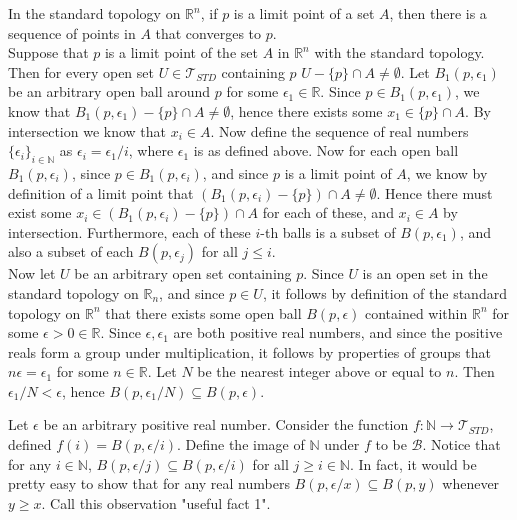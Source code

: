 \documentclass{article}
\newcommand{\N}{\mathbb{N}}
\newcommand{\R}{\mathbb{R}}
\newcommand{\standtop}{\mathcal{T}_{STD}}
\begin{document}
 


 In the standard topology on $\R^n$, if $p$ is a limit point of a set $A$, then there is a sequence of points in $A$ that converges to $p$. \\

 Suppose that $p$ is a limit point of the set $A$ in $\R^n$ with the standard topology. Then for every open set $U\in \standtop$ containing $p$ $U-\{p\}\cap A \ne \emptyset$. Let $B_1(p,\epsilon_1)$ be an arbitrary open ball around $p$ for some $\epsilon_1\in \R$. Since $p\in B_1(p,\epsilon_1)$, we know that $B_1(p,\epsilon_1) - \{p\}\cap A \ne \emptyset$, hence there exists some $x_1 \in \{p\}\cap A$. By intersection we know that $x_i\in A$. Now define the sequence of real numbers $\{\epsilon_i\}_{i \in \N}$ as $\epsilon_i = \epsilon_1/i$, where $\epsilon_1$ is as defined above. Now for each open ball $B_1(p,\epsilon_i)$, since $p\in B_1(p,\epsilon_i)$, and since $p$ is a limit point of $A$, we know by definition of a limit point that $(B_1(p,\epsilon_i) - \{p\})\cap A\ne \emptyset $. Hence there must exist some $x_i\in (B_1(p,\epsilon_i) - \{p\})\cap A$ for each of these, and $x_i\in A$ by intersection. Furthermore, each of these $i$-th balls is a subset of $B(p,\epsilon_1)$, and also a subset of each $B(p,\epsilon_j)$ for all $j\le i$. \\

Now let $U$ be an arbitrary open set containing $p$. Since $U$ is an open set in the standard topology on $\R_n$, and since $p\in U$, it follows by definition of the standard topology on $\R^n$ that there exists some open ball $B(p,\epsilon)$ contained within $\R^n$ for some $\epsilon > 0 \in \R$. Since $\epsilon,\epsilon_1$ are both positive real numbers, and since the positive reals form a group under multiplication, it follows by properties of groups that $n\epsilon = \epsilon_1$ for some $n\in \R$. Let $N$ be the nearest integer above or equal to $n$. Then $\epsilon_1/N < \epsilon$, hence $B(p,\epsilon_1/N)\subseteq B(p,\epsilon)$. \\

\newpage

 Let $\epsilon $ be an arbitrary positive real number. Consider the function $f: \N \rightarrow \standtop$, defined $f(i) = B(p,\epsilon/i)$. Define the image of $\N$ under $f$ to be $\mathcal{B}$. Notice that for any $i\in \N$, $B(p,\epsilon/j)\subseteq B(p,\epsilon/i)$ for all $j\ge i\in \N$. In fact, it would be pretty easy to show that for any real numbers  $B(p,\epsilon/x) \subseteq B(p,y)$ whenever $y\ge x$. Call this observation "useful fact 1". \\
\end{document}
